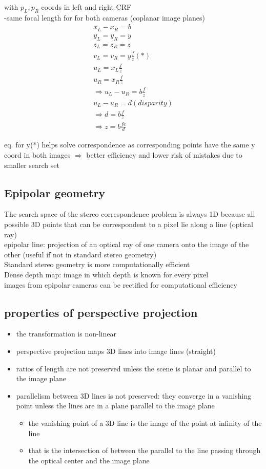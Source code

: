 \documentclass{article}
\begin{document}
with $p_L, p_R$ coords in left and right CRF\\
-same focal length for for both cameras (coplanar image planes)
\begin{gather*}
x_L-x_R=b\\
y_L=y_R=y\\
z_L=z_R=z\\
v_L=v_R=y \frac{f}{z} (*)\\
u_L=x_L \frac{f}{z}\\
u_R=x_R \frac{f}{z}\\
\Rightarrow u_L-u_R=b \frac{f}{z}\\
u_L-u_R=d (disparity)\\
\Rightarrow d=b \frac{f}{z}\\
\Rightarrow z = b \frac{fe}{d}
\end{gather*}

eq. for y(*) helps solve correspondence as corresponding points have the same y coord in both images $\Rightarrow$ better efficiency and lower risk of mistakes due to smaller search set
\subsection{Epipolar geometry}
The search space of the stereo correspondence problem is always 1D because all possible 3D points that can be correspondent to a pixel lie along a line (optical ray)\\
epipolar line: projection of an optical ray of one camera onto the image of the other (useful if not in standard stereo geometry)\\
Standard stereo geometry is more computationally efficient\\
Dense depth map: image in which depth is known for every pixel\\
images from epipolar cameras can be rectified for computational efficiency

\subsection{properties of perspective projection}
\begin{itemize}
	\item the transformation is non-linear
	\item perspective projection maps 3D lines into image lines (straight)
	\item ratios of length are not preserved unless the scene is planar and parallel to the image plane
	\item parallelism between 3D lines is not preserved: they converge in a vanishing point unless the lines are in a plane parallel to the image plane \begin{itemize}
		\item the vanishing point of a 3D line is the image of the point at infinity of the line
		\item that is the intersection of between the parallel to the line passing through the optical center and the image plane
	\end{itemize}
	
\end{itemize}
\end{document}
